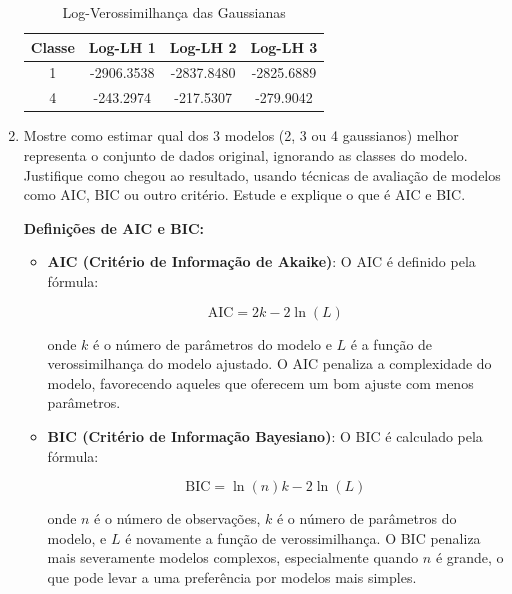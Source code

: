 \begin{enumerate}
\begin{table}[H]
    \centering
    \caption{Log-Verossimilhança das Gaussianas}
    \begin{tabular}{|c|c|c|c|}
        \hline
        Classe & Log-LH 1 & Log-LH 2 & Log-LH 3 \\ \hline
        1 & -2906.3538 & -2837.8480 & -2825.6889 \\ \hline
        4 & -243.2974 & -217.5307 & -279.9042 \\ \hline
    \end{tabular}
    \label{tab:log-likelihood_2}
\end{table}

\newpage

\item Mostre como estimar qual dos 3 modelos (2, 3 ou 4 gaussianos) melhor representa o conjunto de dados original, ignorando as classes do modelo. Justifique como chegou ao resultado, usando técnicas de avaliação de modelos como AIC, BIC ou outro critério. Estude e explique o que é AIC e BIC.

\begin{tcolorbox}[colback=white, colframe=black, title=Resposta:]
    \textbf{Definições de AIC e BIC:} 
    
    \begin{itemize}
        \item \textbf{AIC (Critério de Informação de Akaike)}: O AIC é definido pela fórmula:
    
        \[
        \text{AIC} = 2k - 2\ln(L)
        \]
    
        onde \(k\) é o número de parâmetros do modelo e \(L\) é a função de verossimilhança do modelo ajustado. O AIC penaliza a complexidade do modelo, favorecendo aqueles que oferecem um bom ajuste com menos parâmetros.
    
        \item \textbf{BIC (Critério de Informação Bayesiano)}: O BIC é calculado pela fórmula:
    
        \[
        \text{BIC} = \ln(n)k - 2\ln(L)
        \]
    
        onde \(n\) é o número de observações, \(k\) é o número de parâmetros do modelo, e \(L\) é novamente a função de verossimilhança. O BIC penaliza mais severamente modelos complexos, especialmente quando \(n\) é grande, o que pode levar a uma preferência por modelos mais simples.
    
    \end{itemize}
    

\end{tcolorbox}
\end{enumerate}
